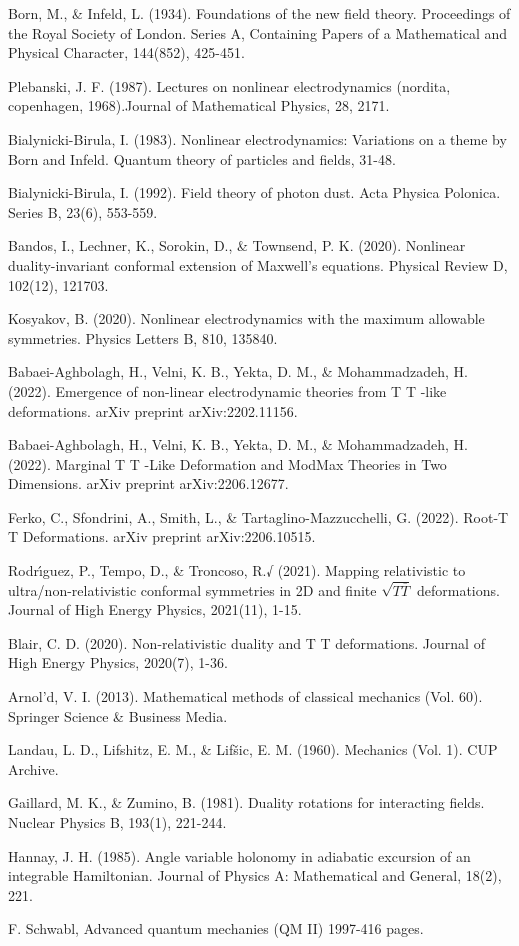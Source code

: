 \documentclass[12pt,a4paper, openany]{report}
\begin{document}
		\begin{flushleft}
			\begin{enumerate}
				[1] Born, M., \& Infeld, L. (1934). Foundations of the new field theory. Proceedings of the Royal Society of London. Series A, Containing Papers of a Mathematical and Physical Character,
				144(852), 425-451. \par
				[2] Plebanski, J. F. (1987). Lectures on nonlinear electrodynamics (nordita, copenhagen, 1968).Journal of Mathematical Physics, 28, 2171. \par
				[3] Bialynicki-Birula, I. (1983). Nonlinear electrodynamics: Variations on a theme by Born and Infeld. Quantum theory of particles and fields, 31-48. \par
				[4] Bialynicki-Birula, I. (1992). Field theory of photon dust. Acta Physica Polonica. Series B, 23(6), 553-559. \par
				[5] Bandos, I., Lechner, K., Sorokin, D., \& Townsend, P. K. (2020). Nonlinear duality-invariant conformal extension of Maxwell’s equations. Physical Review D, 102(12), 121703. \par
				[6] Kosyakov, B. (2020). Nonlinear electrodynamics with the maximum allowable symmetries. Physics Letters B, 810, 135840. \par
				[7] Babaei-Aghbolagh, H., Velni, K. B., Yekta, D. M., \& Mohammadzadeh, H. (2022).
				Emergence of non-linear electrodynamic theories from T T -like deformations. arXiv preprint arXiv:2202.11156. \par
				[8] Babaei-Aghbolagh, H., Velni, K. B., Yekta, D. M., \& Mohammadzadeh, H. (2022).
				Marginal T T -Like Deformation and ModMax Theories in Two Dimensions. arXiv preprint arXiv:2206.12677. \par
				[9] Ferko, C., Sfondrini, A., Smith, L., \& Tartaglino-Mazzucchelli, G. (2022). Root-T T Deformations. arXiv preprint arXiv:2206.10515. \par
				[10] Rodrı́guez, P., Tempo, D., \& Troncoso, R.√ (2021). Mapping relativistic to ultra/non-relativistic conformal symmetries in 2D and finite $\sqrt{T\overline{T}}$ deformations. Journal of High Energy Physics, 2021(11), 1-15. \par
				[11] Blair, C. D. (2020). Non-relativistic duality and T T deformations. Journal of High Energy Physics, 2020(7), 1-36. \par
				[12] Arnol’d, V. I. (2013). Mathematical methods of classical mechanics (Vol. 60). Springer Science \& Business Media. \par
				[13] Landau, L. D., Lifshitz, E. M., \& Lifšic, E. M. (1960). Mechanics (Vol. 1). CUP Archive. \par 
				[14] Gaillard, M. K., \& Zumino, B. (1981). Duality rotations for interacting fields. Nuclear Physics B, 193(1), 221-244. \par
				[15] Hannay, J. H. (1985). Angle variable holonomy in adiabatic excursion of an integrable Hamiltonian. Journal of Physics A: Mathematical and General, 18(2), 221. \par
				[16] F. Schwabl, Advanced quantum mechanies (QM II) 1997-416 pages.
			\end{enumerate}
		\end{flushleft}
		
\end{document}
